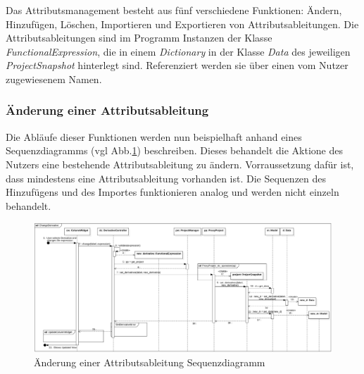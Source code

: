 \documentclass{article}
\begin{document}
Das Attributsmanagement besteht aus fünf verschiedene Funktionen: Ändern, Hinzufügen, Löschen, Importieren und Exportieren von Attributsableitungen. Die Attributsableitungen sind im Programm Instanzen der Klasse \textit{FunctionalExpression}, die in einem \textit{Dictionary} in der Klasse \textit{Data} des jeweiligen \textit{ProjectSnapshot} hinterlegt sind. Referenziert werden sie über einen vom Nutzer zugewiesenem Namen.

\subsubsection{Änderung einer Attributsableitung}
Die Abläufe dieser Funktionen werden nun beispielhaft anhand eines Sequenzdiagramms (vgl Abb.\ref{ChangeDerivativeSequenceDiagram}) beschreiben. Dieses behandelt die Aktione des Nutzers eine bestehende Attributsableitung zu ändern. Vorraussetzung dafür ist, dass mindestens eine Attributsableitung vorhanden ist. Die Sequenzen des Hinzufügens und des Importes funktionieren analog und werden nicht einzeln behandelt.

\begin{figure}[H]%
    \centering
    \includegraphics[width=12cm]{entwurf/Floriane/ChangeDerivative.png}
    \caption{Änderung einer Attributsableitung Sequenzdiagramm}
    \label{ChangeDerivativeSequenceDiagram}
\end{figure}
\end{document}
